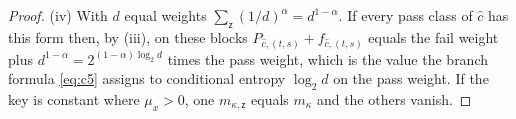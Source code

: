 \begin{proof}
(iv) With $d$ equal weights $\sum_{\mathsf z}(1/d)^{\alpha}=d^{1-\alpha}$. If
every pass class of $\hat c$ has this form then, by (iii), on these blocks
$P_{\hat c,(t,s)}+f_{\hat c,(t,s)}$ equals the fail weight plus
$d^{1-\alpha}=2^{(1-\alpha)\log_2d}$ times the pass weight, which is the
value the branch formula \eqref{eq:c5} assigns to conditional entropy
$\log_2d$ on the pass weight. If the key is constant where $\mu_x>0$, one
$m_{\kappa,\mathsf z}$ equals $m_{\kappa}$ and the others vanish.
\end{proof}
